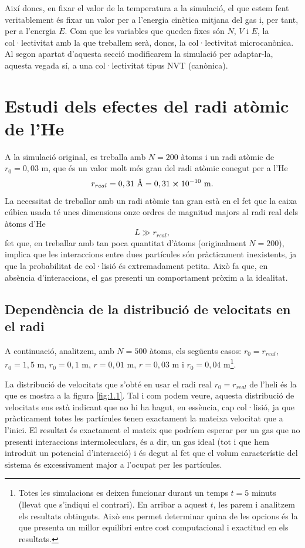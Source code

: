 \documentclass[a4paper,10.5pt]{report}
\begin{document}
Així doncs, en fixar el valor de la temperatura a la simulació, el que estem fent veritablement és fixar un valor per a l'energia cinètica mitjana del gas i, per tant, per a l'energia $E$. Com que les variables que queden fixes són $N$, $V$ i $E$, la col·lectivitat amb la que treballem serà, doncs, la col·lectivitat microcanònica. Al segon apartat d'aquesta secció modificarem la simulació per adaptar-la, aquesta vegada sí, a una col·lectivitat tipus NVT (canònica).


\section{Estudi dels efectes del radi atòmic de l'He}
A la simulació original, es treballa amb $N=200$ àtoms i un radi atòmic de $r_0 = 0,03$ m, que és un valor molt més gran del radi atòmic conegut per a l'He 
\begin{equation*}
	r_{real} = 0,31 \text{ \AA} = 0,31\cross 10^{-10} \text{ m}.
\end{equation*}
La necessitat de treballar amb un radi atòmic tan gran està en el fet que la caixa cúbica usada té unes dimensions onze ordres de magnitud majors al radi real dels àtoms d'He
\begin{equation*}
	L \gg r_{real},
\end{equation*}
fet que, en treballar amb tan poca quantitat d'àtoms (originalment $N=200$), implica que les interaccions entre dues partícules són pràcticament inexistents, ja que la probabilitat de col·lisió és extremadament petita. Això fa que, en absència d'interaccions, el gas presenti un comportament pròxim a la idealitat. 

\subsection{Dependència de la distribució de velocitats en el radi}
A continuació, analitzem, amb $N = 500$ àtoms, els següents casos: $r_0 = r_{real}$, $r_0 = 1,5$ m, $r_0 = 0,1$ m, $r = 0,01$ m, $r = 0,03$ m i $r_0 = 0,04$ m\footnote{Totes les simulacions es deixen funcionar durant un temps $t = 5$ minuts (llevat que s'indiqui el contrari). En arribar a aquest $t$, les parem i analitzem els resultats obtinguts. Això ens permet determinar quina de les opcions és la que presenta un millor equilibri entre cost computacional i exactitud en els resultats.}. 

La distribució de velocitats que s'obté en usar el radi real $r_0 = r_{real}$ de l'heli és la que es mostra a la figura \ref{fig:1.1}. Tal i com podem veure, aquesta distribució de velocitats ens està indicant que no hi ha hagut, en essència, cap col·lisió, ja que pràcticament totes les partícules tenen exactament la mateixa velocitat que a l'inici. El resultat és exactament el mateix que podríem esperar per un gas que no presenti interaccions intermoleculars, és a dir, un gas ideal (tot i que hem introduït un potencial d'interacció) i és degut al fet que el volum característic del sistema és excessivament major a l'ocupat per les partícules.
\end{document}
